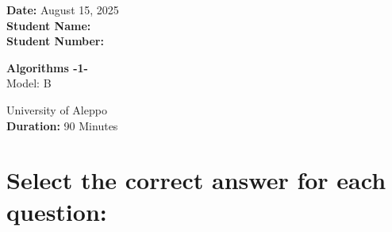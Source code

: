 \documentclass[12pt]{article}
\begin{document}
\begin{minipage}[t]{0.3\textwidth}
    \textbf{Date:} August 15, 2025\\[0.5em]
    \textbf{Student Name: }\\[0.5em]
    \textbf{Student Number: }
\end{minipage}
\begin{minipage}[t]{0.3\textwidth}
    \centering
    \Large\textbf{Algorithms -1-}\\[0.5em]
    \Large{Model:} B\\[0.5em]
\end{minipage}\hfill
\begin{minipage}[t]{0.3\textwidth}
    \raggedleft
    University of Aleppo\\[0.5em]
    \textbf{Duration: }90 Minutes
\end{minipage}

\vspace{1.5cm}

\section*{\small Select the correct answer for each question:}
\end{document}
